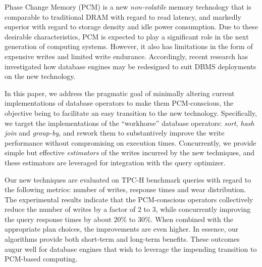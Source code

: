 Phase Change Memory (PCM) is a new \emph{non-volatile} memory technology
that is comparable to traditional DRAM with regard to read latency,
and markedly superior with regard to storage density and idle
power consumption. Due to these desirable characteristics, PCM is
expected to play a significant role in the next generation of computing
systems. However, it also has limitations in the form of expensive writes
and limited write endurance. Accordingly, recent research has investigated
how database engines may be redesigned to suit DBMS deployments on the
new technology.

In this paper, we address the pragmatic goal of minimally altering current
implementations of database operators to make them PCM-conscious,
the objective being to facilitate an easy transition to the new
technology. Specifically, we target the implementations of the
``workhorse'' database operators: \emph{sort}, \emph{hash join} and
\emph{group-by}, and rework them to substantively improve the write
performance without compromising on execution times. Concurrently, we
provide simple but effective \emph{estimators} of the writes incurred
by the new techniques, and these estimators are leveraged for 
integration with the query optimizer.

Our new techniques are evaluated on TPC-H benchmark queries with
regard to the following metrics: number of writes, response times and wear distribution. The experimental results indicate that the PCM-conscious
operators collectively reduce the number of writes by a factor of 2 to
3, while concurrently improving the query response times by about 20\% to
30\%.  When combined with the appropriate plan choices, the improvements
are even higher.  In essence, our algorithms provide both short-term and
long-term benefits.  These outcomes augur well for database engines that
wish to leverage the impending transition to PCM-based computing.
